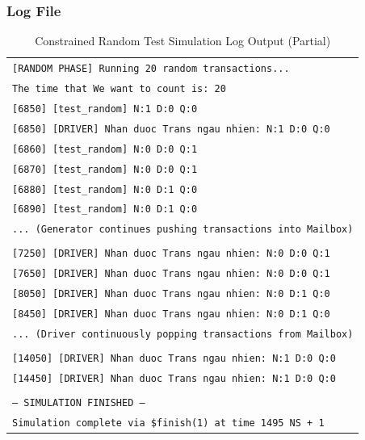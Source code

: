 \subsubsection*{Log File}
\begin{table}[H]
	\centering
	\begin{tabular}{|p{}|}
		\hline
		\texttt{\small [RANDOM PHASE] Running 20 random transactions...} \\
		\texttt{\small The time that We want to count is: 20} \\
		\texttt{\small [6850] [test\_random] N:1 D:0 Q:0} \\
		\texttt{\small [6850] [DRIVER] Nhan duoc Trans ngau nhien: N:1 D:0 Q:0} \\
		\texttt{\small [6860] [test\_random] N:0 D:0 Q:1} \\
		\texttt{\small [6870] [test\_random] N:0 D:0 Q:1} \\
		\texttt{\small [6880] [test\_random] N:0 D:1 Q:0} \\
		\texttt{\small [6890] [test\_random] N:0 D:1 Q:0} \\
		\texttt{\small ... (Generator continues pushing transactions into Mailbox)} \\
		\texttt{\small } \\
		\texttt{\small [7250] [DRIVER] Nhan duoc Trans ngau nhien: N:0 D:0 Q:1} \\
		\texttt{\small [7650] [DRIVER] Nhan duoc Trans ngau nhien: N:0 D:0 Q:1} \\
		\texttt{\small [8050] [DRIVER] Nhan duoc Trans ngau nhien: N:0 D:1 Q:0} \\
		\texttt{\small [8450] [DRIVER] Nhan duoc Trans ngau nhien: N:0 D:1 Q:0} \\
		\texttt{\small ... (Driver continuously popping transactions from Mailbox)} \\
		\texttt{\small } \\
		\texttt{\small [14050] [DRIVER] Nhan duoc Trans ngau nhien: N:1 D:0 Q:0} \\
		\texttt{\small [14450] [DRIVER] Nhan duoc Trans ngau nhien: N:1 D:0 Q:0} \\
		\texttt{\small } \\
		\texttt{\small --- SIMULATION FINISHED ---} \\
		\texttt{\small Simulation complete via \$finish(1) at time 1495 NS + 1} \\ \hline
	\end{tabular}
	\caption{Constrained Random Test Simulation Log Output (Partial)}
	\label{tab:random_log}
\end{table}
\newpage

